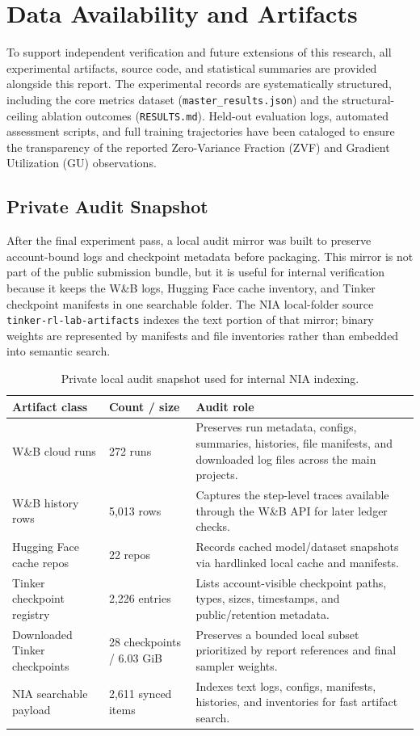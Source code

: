 \documentclass[12pt,a4paper]{report}
\begin{document}
\chapter{Data Availability and Artifacts}
\label{app:reproducibility}

To support independent verification and future extensions of this research, all experimental artifacts, source code, and statistical summaries are provided alongside this report. The experimental records are systematically structured, including the core metrics dataset (\texttt{master\_results.json}) and the structural-ceiling ablation outcomes (\texttt{RESULTS.md}). Held-out evaluation logs, automated assessment scripts, and full training trajectories have been cataloged to ensure the transparency of the reported Zero-Variance Fraction (ZVF) and Gradient Utilization (GU) observations.

\section*{Private Audit Snapshot}

After the final experiment pass, a local audit mirror was built to preserve account-bound logs and checkpoint metadata before packaging. This mirror is not part of the public submission bundle, but it is useful for internal verification because it keeps the W\&B logs, Hugging Face cache inventory, and Tinker checkpoint manifests in one searchable folder. The NIA local-folder source \texttt{tinker-rl-lab-artifacts} indexes the text portion of that mirror; binary weights are represented by manifests and file inventories rather than embedded into semantic search.

\begin{table}[ht]
\centering
\caption{Private local audit snapshot used for internal NIA indexing.}
\label{tab:private-audit-snapshot}
\small
\footnotesize
\begin{tabularx}{\textwidth}{p{3.1cm}p{2.4cm}X}
\toprule
Artifact class & Count / size & Audit role\\
\midrule
W\&B cloud runs & 272 runs & Preserves run metadata, configs, summaries, histories, file manifests, and downloaded log files across the main projects.\\
W\&B history rows & 5,013 rows & Captures the step-level traces available through the W\&B API for later ledger checks.\\
Hugging Face cache repos & 22 repos & Records cached model/dataset snapshots via hardlinked local cache and manifests.\\
Tinker checkpoint registry & 2,226 entries & Lists account-visible checkpoint paths, types, sizes, timestamps, and public/retention metadata.\\
Downloaded Tinker checkpoints & 28 checkpoints / 6.03 GiB & Preserves a bounded local subset prioritized by report references and final sampler weights.\\
NIA searchable payload & 2,611 synced items & Indexes text logs, configs, manifests, histories, and inventories for fast artifact search.\\
\bottomrule
\end{tabularx}
\end{table}
\end{document}
